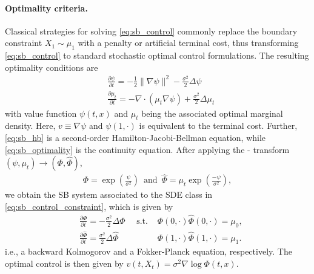 \paragraph{Optimality criteria.}
Classical strategies for solving \eqref{eq:sb_control} commonly replace the boundary constraint $X_1 \sim \mu_1$ with a penalty or artificial terminal cost, thus transforming \eqref{eq:sb_control} to standard stochastic optimal control formulations. 
The resulting optimality conditions are
\begin{align}
\label{eq:sb_hb} & \frac{\partial \psi}{\partial t} = -\frac{1}{2}\|\nabla \psi\|^2 -\frac{\sigma^2}{2} \Delta \psi \\
\label{eq:sb_optimality}
& \frac{\partial \mu_t}{\partial t} = - \nabla \cdot(\mu_t \nabla \psi) +\frac{\sigma^2}{2} \Delta \mu_t
\end{align}
with value function $\psi(t, x)$ and $\mu_t$ being the associated optimal marginal density. Here, $v \equiv \nabla \psi$ and $\psi(1, \cdot)$ is equivalent to the terminal cost. Further, \cref{eq:sb_hb} is a second-order Hamilton-Jacobi-Bellman equation, while \eqref{eq:sb_optimality} is the continuity equation.
After applying the \citeauthor{hopf1950partial}-\citeauthor{cole1951quasi} transform $(\psi, \mu_t) \rightarrow (\Phi, \widehat{\Phi})$, 
\begin{align*}
    \Phi = \exp (\frac{\psi}{\sigma^2}) \enspace \text{and} \enspace \widehat{\Phi} = \mu_t \exp (\frac{-\psi}{\sigma^2}),
\end{align*}
we obtain the \acrshort{SB} system associated to the \acrshort{SDE} class in \eqref{eq:sb_control_constraint}, which is given by
\begin{align}
& \frac{\partial \Phi}{\partial t}=-\frac{\sigma^2}{2} \Delta \Phi 
\quad \text { s.t. } & \Phi(0, \cdot) \widehat{\Phi}(0, \cdot)=\mu_0, \\ \nonumber
& \frac{\partial \widehat{\Phi}}{\partial t}=\frac{\sigma^2}{2} \Delta \widehat{\Phi} \quad & \Phi(1, \cdot) \widehat{\Phi}(1, \cdot)=\mu_1.
\end{align}
i.e., a backward Kolmogorov and a Fokker-Planck equation, respectively. The optimal control is then given by $
v(t, X_t)=\sigma^2 \nabla \log \Phi(t, x)$.

